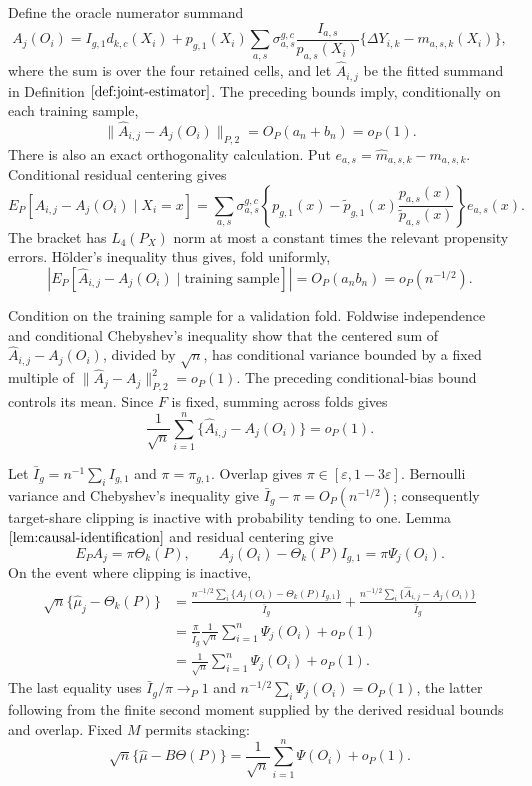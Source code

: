 Define the oracle numerator summand
\[
 A_j(O_i)=I_{g,1}d_{k,c}(X_i)
 +p_{g,1}(X_i)\sum_{a,s}\sigma_{a,s}^{g,c}
 \frac{I_{a,s}}{p_{a,s}(X_i)}
 \{\Delta Y_{i,k}-m_{a,s,k}(X_i)\},
\]
where the sum is over the four retained cells, and let \(\widehat A_{i,j}\) be the fitted summand in Definition \(\ref{def:joint-estimator}\).  The preceding bounds imply, conditionally on each training sample,
\[
 \|\widehat A_{i,j}-A_j(O_i)\|_{P,2}=O_P(a_n+b_n)=o_P(1).
\]
There is also an exact orthogonality calculation.  Put \(e_{a,s}=\widehat m_{a,s,k}-m_{a,s,k}\).  Conditional residual centering gives
\[
 E_P[\widehat A_{i,j}-A_j(O_i)\mid X_i=x]
 =\sum_{a,s}\sigma_{a,s}^{g,c}
 \left\{p_{g,1}(x)-\widetilde p_{g,1}(x)
 \frac{p_{a,s}(x)}{\widetilde p_{a,s}(x)}\right\}e_{a,s}(x).
\]
The bracket has \(L_4(P_X)\) norm at most a constant times the relevant propensity errors.  Hölder's inequality thus gives, fold uniformly,
\[
 \left|E_P[\widehat A_{i,j}-A_j(O_i)\mid\text{training sample}]\right|
 =O_P(a_nb_n)=o_P(n^{-1/2}).
\]

Condition on the training sample for a validation fold.  Foldwise independence and conditional Chebyshev's inequality show that the centered sum of \(\widehat A_{i,j}-A_j(O_i)\), divided by \(\sqrt n\), has conditional variance bounded by a fixed multiple of \(\|\widehat A_j-A_j\|_{P,2}^2=o_P(1)\).  The preceding conditional-bias bound controls its mean.  Since \(F\) is fixed, summing across folds gives
\[
 \frac1{\sqrt n}\sum_{i=1}^n\{\widehat A_{i,j}-A_j(O_i)\}=o_P(1).
\]

Let \(\bar I_g=n^{-1}\sum_i I_{g,1}\) and \(\pi=\pi_{g,1}\).  Overlap gives \(\pi\in[\varepsilon,1-3\varepsilon]\).  Bernoulli variance and Chebyshev's inequality give \(\bar I_g-\pi=O_P(n^{-1/2})\); consequently target-share clipping is inactive with probability tending to one.  Lemma \(\ref{lem:causal-identification}\) and residual centering give
\[
 E_PA_j=\pi\Theta_k(P),
 \qquad
 A_j(O_i)-\Theta_k(P)I_{g,1}=\pi\Psi_j(O_i).
\]
On the event where clipping is inactive,
\[
\begin{aligned}
 \sqrt n\{\widehat\mu_j-\Theta_k(P)\}
 &=\frac{n^{-1/2}\sum_i\{A_j(O_i)-\Theta_k(P)I_{g,1}\}}{\bar I_g}
   +\frac{n^{-1/2}\sum_i\{\widehat A_{i,j}-A_j(O_i)\}}{\bar I_g}\\
 &=\frac{\pi}{\bar I_g}\frac1{\sqrt n}\sum_{i=1}^n\Psi_j(O_i)+o_P(1)\\
 &=\frac1{\sqrt n}\sum_{i=1}^n\Psi_j(O_i)+o_P(1).
\end{aligned}
\]
The last equality uses \(\bar I_g/\pi\to_P1\) and \(n^{-1/2}\sum_i\Psi_j(O_i)=O_P(1)\), the latter following from the finite second moment supplied by the derived residual bounds and overlap.  Fixed \(M\) permits stacking:
\[
 \sqrt n\{\widehat\mu-B\Theta(P)\}
 =\frac1{\sqrt n}\sum_{i=1}^n\Psi(O_i)+o_P(1).
\]

